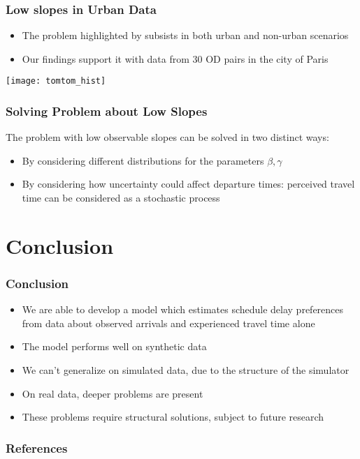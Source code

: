 \documentclass[hyperref={pdfpagelabels=false}]{beamer}
\begin{document}
\begin{frame}
  \frametitle{Low slopes in Urban Data}
  \begin{itemize}
  \item The problem highlighted by \textcite{https://doi.org/10.1111/iere.12692} subsists in both urban and non-urban scenarios
  \item Our findings support it with data from 30 OD pairs in the city of Paris
  \end{itemize}
  \centering
  \texttt{[image: tomtom\_hist]}
\end{frame}

\begin{frame}
  \frametitle{Solving Problem about Low Slopes }
  The problem with low observable slopes can be solved in two distinct ways:
  \begin{itemize}
  \item<2-> By considering different distributions for the parameters \(\beta, \gamma\)
  \item<3-> By considering how uncertainty could affect departure times:
    perceived travel time can be considered as a stochastic process
  \end{itemize}
\end{frame}

\section{Conclusion}

\begin{frame}
  \tableofcontents[currentsection]
\end{frame}

\begin{frame}
  \frametitle{Conclusion}
  \begin{itemize}
  \item We are able to develop a model which estimates schedule delay preferences from data about observed arrivals and experienced travel time alone
  \item<2-> The model performs well on synthetic data
  \item<3-> We can't generalize on simulated data, due to the structure of the simulator
  \item<4-> On real data, deeper problems are present
  \item<5-> These problems require structural solutions, subject to future research
  \end{itemize}
\end{frame}

\begin{frame}[allowframebreaks]
  \frametitle{References}
  \printbibliography
\end{frame}
\end{document}
